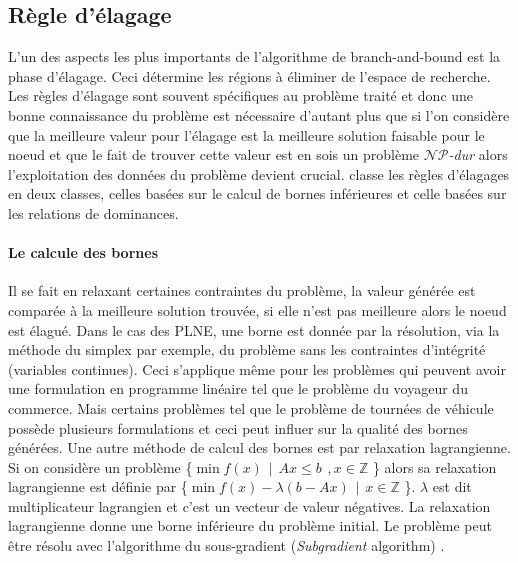 \documentclass[12pt,a4paper,oneside]{book}
\theoremstyle{definition}
\newcommand{\Z}{\mathbb{Z}}
\begin{document}
	\subsection{Règle d'élagage}
	L'un des aspects les plus importants de l'algorithme de branch-and-bound est la phase d'élagage. Ceci détermine les régions à éliminer de l'espace de recherche. Les règles d'élagage sont souvent spécifiques au problème traité et donc une bonne connaissance du problème est nécessaire d'autant plus que si l'on considère que la meilleure valeur pour l'élagage est la meilleure solution faisable pour le noeud et que le fait de trouver cette valeur est en sois un problème \textit{$\mathcal{NP}$-dur} \cite{Clausen99branchand} alors l'exploitation des données du problème devient crucial. \cite{MORRISON201679} classe les règles d'élagages en deux classes, celles basées sur le calcul de bornes inférieures et celle basées sur les relations de dominances.
	
	\paragraph{Le calcule des bornes}
	Il se fait en relaxant certaines contraintes du problème, la valeur générée est comparée à la meilleure solution trouvée, si elle n'est pas meilleure alors le noeud est élagué. Dans le cas des PLNE, une borne est donnée par la résolution, via la méthode du simplex par exemple, du problème sans les contraintes d'intégrité (variables continues). Ceci s'applique même pour les problèmes qui peuvent avoir une formulation en programme linéaire tel que le problème du voyageur du commerce. Mais certains problèmes tel que le problème de tournées de véhicule possède plusieurs formulations \cite{desrochers1992new} et ceci peut influer sur la qualité des bornes générées. Une autre méthode de calcul des bornes est par relaxation lagrangienne. Si on considère un problème \{$ \min f(x) \hspace{5pt} | \hspace{5pt} Ax \leq b  \hspace{5pt}, x \in \Z$ \} alors sa relaxation lagrangienne est définie par  \{$ \min f(x)- \lambda(b-Ax) \hspace{5pt} | \hspace{5pt} x \in \Z$ \}. $\lambda$ est dit multiplicateur lagrangien et c'est un vecteur de valeur négatives. La relaxation lagrangienne donne une borne inférieure du problème initial. Le problème peut être résolu avec l'algorithme du sous-gradient (\textit{Subgradient} algorithm) \cite{fisher1981lagrangian}. 
	
\end{document}
